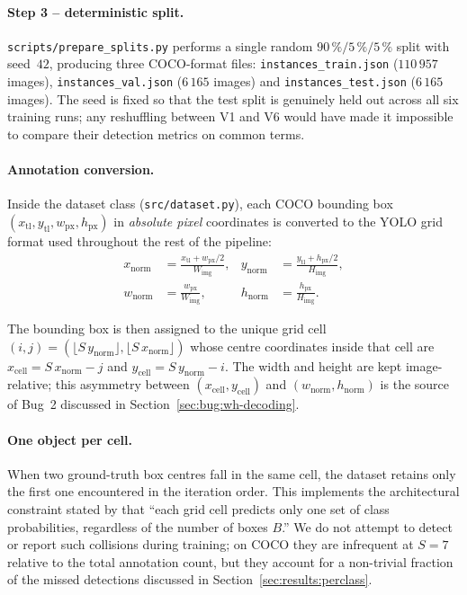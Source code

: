 \paragraph{Step 3 -- deterministic split.}
\texttt{scripts/prepare\_splits.py} performs a single random
$90\,\%/5\,\%/5\,\%$ split with seed~$42$, producing three COCO-format files:
\texttt{instances\_train.json} ($110\,957$ images), \texttt{instances\_val.json}
($6\,165$ images) and \texttt{instances\_test.json} ($6\,165$ images). The
seed is fixed so that the test split is genuinely held out across all six
training runs; any reshuffling between V1 and V6 would have made it impossible
to compare their detection metrics on common terms.

\paragraph{Annotation conversion.} Inside the dataset class
(\texttt{src/dataset.py}), each COCO bounding box
$(x_{\text{tl}}, y_{\text{tl}}, w_{\text{px}}, h_{\text{px}})$ in
\emph{absolute pixel} coordinates is converted to the YOLO grid format used
throughout the rest of the pipeline:
\begin{align}
  x_{\text{norm}} &= \frac{x_{\text{tl}} + w_{\text{px}}/2}{W_{\text{img}}}, &
  y_{\text{norm}} &= \frac{y_{\text{tl}} + h_{\text{px}}/2}{H_{\text{img}}}, \\
  w_{\text{norm}} &= \frac{w_{\text{px}}}{W_{\text{img}}}, &
  h_{\text{norm}} &= \frac{h_{\text{px}}}{H_{\text{img}}}.
\end{align}

\noindent The bounding box is then assigned to the unique grid cell
$(i, j) = (\lfloor S\,y_{\text{norm}} \rfloor, \lfloor S\,x_{\text{norm}} \rfloor)$
whose centre coordinates inside that cell are
$x_{\text{cell}} = S\,x_{\text{norm}} - j$ and
$y_{\text{cell}} = S\,y_{\text{norm}} - i$. The width and height are kept
image-relative; this asymmetry between $(x_{\text{cell}}, y_{\text{cell}})$
and $(w_{\text{norm}}, h_{\text{norm}})$ is the source of Bug~2 discussed in
Section~\ref{sec:bug:wh-decoding}.

\paragraph{One object per cell.} When two ground-truth box centres fall in
the same cell, the dataset retains only the first one encountered in the
iteration order. This implements the architectural constraint stated by
\citet{redmon2016you} that ``each grid cell predicts only one set of class
probabilities, regardless of the number of boxes $B$.'' We do not attempt to
detect or report such collisions during training; on COCO they are
infrequent at $S=7$ relative to the total annotation count, but they account
for a non-trivial fraction of the missed detections discussed in
Section~\ref{sec:results:perclass}.

